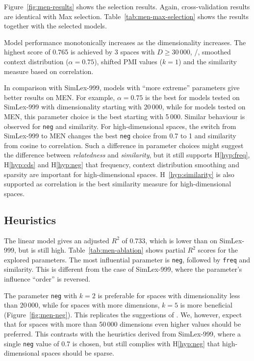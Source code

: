 

Figure~\ref{fig:men-results} shows the selection results. Again, cross-validation results are identical with Max selection. Table~\ref{tab:men-max-selection} shows the results together with the selected models.



Model performance monotonically increases as the dimensionality increases. The highest score of 0.765 is achieved by 3 spaces with $D \geq 30\,000$, \logNSCPMI/, smoothed context distribution ($\alpha = 0.75$), shifted PMI values ($k = 1$) and the similarity measure based on correlation.

In comparison with SimLex-999, models with ``more extreme'' parameters give better results on MEN. For example, $\alpha = 0.75$ is the best for models tested on SimLex-999 with dimensionality starting with 20\,000, while for models tested on MEN, this parameter choice is the best starting with 5\,000. Similar behaviour is observed for \texttt{neg} and similarity. For high-dimensional spaces, the switch from SimLex-999 to MEN changes the best \texttt{neg} choice from 0.7 to 1 and similarity from cosine to correlation. Such a difference in parameter choices might suggest the difference between \textit{relatedness} and \textit{similarity}, but it still supports H\ref{hyp:freq}, H\ref{hyp:cds} and H\ref{hyp:neg} that frequency, context distribution smoothing and sparsity are important for high-dimensional spaces. H~\ref{hyp:similarity} is also supported as correlation is the best similarity measure for high-dimensional spaces.

\subsection{Heuristics}
\label{sec:heuristics-men}




The linear model gives an adjusted $R^2$ of 0.733, which is lower than on SimLex-999, but is still high. Table~\ref{tab:men-ablation} shows partial $R^2$ scores for the explored parameters. The most influential parameter is \texttt{neg}, followed by \texttt{freq} and similarity. This is different from the case of SimLex-999, where the parameter's influence ``order'' is reversed.


The parameter \texttt{neg} with $k = 2$ is preferable for spaces with dimensionality less than 20\,000, while for spaces with more dimensions,
$k = 5$ is more beneficial (Figure~\ref{fig:men-neg}). This replicates the suggestions of . We, however, expect that for spaces with more than 50\,000 dimensions even higher values should be preferred. This contrasts with the heuristics derived from SimLex-999, where a single \texttt{neg} value of 0.7 is chosen, but still complies with H\ref{hyp:neg} that high-dimensional spaces should be sparse.

